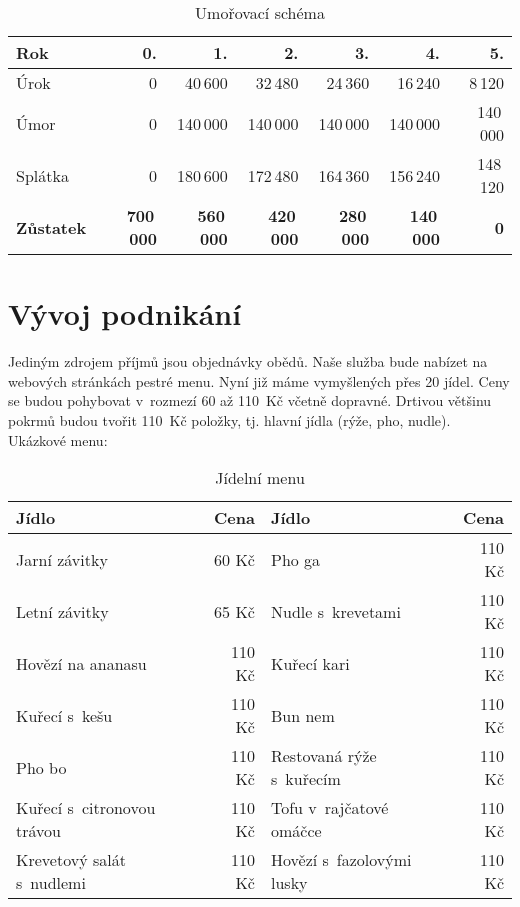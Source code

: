 \begin{table}[htbp]
\begin{center}
\begin{tabular}{ l r r r r r r }

\textbf{Rok} & \textbf{0.} & \textbf{1.} & \textbf{2.} & \textbf{3.} & \textbf{4.} & \textbf{5.} \\ \hline
Úrok & 0 & 40\,600 & 32\,480 & 24\,360 & 16\,240 & 8\,120 \\
Úmor & 0 & 140\,000 & 140\,000 & 140\,000 & 140\,000 & 140\,000 \\
Splátka & 0 & 180\,600 & 172\,480 & 164\,360 & 156\,240 & 148\,120 \\ \hline
\textbf{Zůstatek} & \textbf{700\,000} & \textbf{560\,000} & \textbf{420\,000} & \textbf{280\,000} & \textbf{140\,000} & \textbf{0} \\

\end{tabular}
\caption{Umořovací schéma}
\label{umorovaci_schema}
\end{center}
\end{table}


\newpage



\section{Vývoj podnikání}
Jediným zdrojem příjmů jsou objednávky obědů. Naše služba bude nabízet na webových stránkách pestré menu. Nyní již máme vymyšlených přes 20 jídel. Ceny se budou pohybovat v~rozmezí 60 až 110~Kč včetně dopravné. Drtivou většinu pokrmů budou tvořit 110~Kč položky, tj. hlavní jídla (rýže, pho, nudle). Ukázkové menu:

\begin{table}[htbp]
\begin{center}
\begin{tabular}{ l r | l r }

\textbf{Jídlo} & \textbf{Cena} & \textbf{Jídlo} & \textbf{Cena} \\ \hline
Jarní závitky & 60 Kč & Pho ga & 110 Kč \\ 
Letní závitky & 65 Kč & Nudle s~krevetami & 110 Kč \\ 
Hovězí na ananasu & 110 Kč & Kuřecí kari & 110 Kč \\ 
Kuřecí s~kešu & 110 Kč & Bun nem & 110 Kč \\ 
Pho bo & 110 Kč & Restovaná rýže s~kuřecím & 110 Kč \\ 
Kuřecí s~citronovou trávou & 110 Kč & Tofu v~rajčatové omáčce & 110 Kč \\ 
Krevetový salát s~nudlemi & 110 Kč & Hovězí s~fazolovými lusky & 110 Kč \\ 

\end{tabular}
\caption{Jídelní menu}
\label{jidelni_menu}
\end{center}
\end{table}

